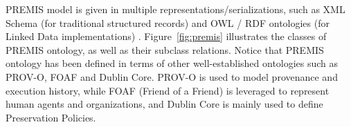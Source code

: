 \documentclass[runningheads]{llncs}
\begin{document}
	PREMIS model is given in multiple representations/serializations, such as XML Schema (for traditional structured records)  and OWL / RDF ontologies (for Linked Data implementations) . Figure~\ref{fig:premis} illustrates the classes of PREMIS ontology, as well as their subclass relations. Notice that PREMIS ontology has been defined in terms of other well-established ontologies such as PROV-O, FOAF and Dublin Core. PROV-O  is used to model provenance and execution history, while FOAF (Friend of a Friend)  is leveraged to represent human agents and organizations, and Dublin Core is mainly used to define Preservation Policies.
	
	
	
\end{document}
